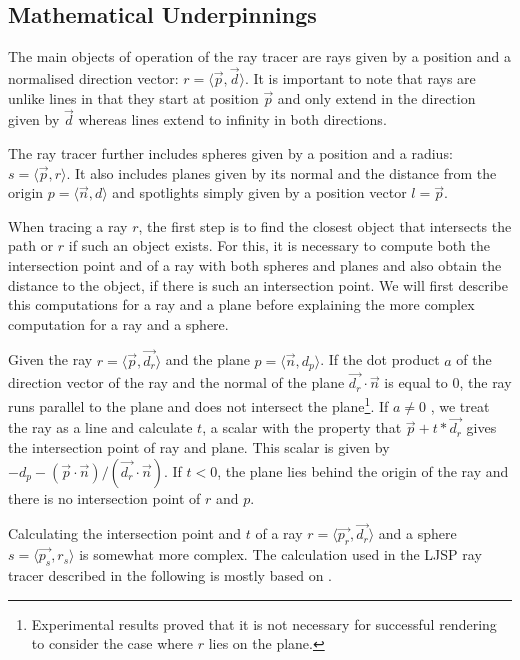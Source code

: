 \documentclass[11pt]{report}
\begin{document}
\subsection{Mathematical Underpinnings}
The main objects of operation of the ray tracer are rays given by a position and a normalised direction vector: $r = \langle \vec{p}, \vec{d} \rangle$. It is important to note that rays are unlike lines in that they start at position $\vec{p}$ and only extend in the direction given by $\vec{d}$ whereas lines extend to infinity in both directions.

The ray tracer further includes spheres given by a position and a radius: $s = \langle \vec{p}, r \rangle$. It also includes planes given by its normal and the distance from the origin $p = \langle \vec{n}, d \rangle$ and spotlights simply given by a position vector $l = \vec{p}$.

When tracing a ray $r$, the first step is to find the closest object that intersects the path or $r$ if such an object exists. For this, it is necessary to compute both the intersection point and of a ray with both spheres and planes and also obtain the distance to the object, if there is such an intersection point. We will first describe this computations for a ray and a plane before explaining the more complex computation for a ray and a sphere.

Given the ray $r = \langle \vec{p}, \vec{d_r} \rangle$ and the plane $p = \langle \vec{n}, d_p \rangle$. If the dot product $a$ of the direction vector of the ray and the normal of the plane $\vec{d_r} \cdot \vec{n}$ is equal to $0$, the ray runs parallel to the plane and does not intersect the plane\footnote{Experimental results proved that it is not necessary for successful rendering to consider the case where $r$ lies on the plane.}. If $a \neq 0$ , we treat the ray as a line and calculate $t$, a scalar with the property that $\vec{p} + t*\vec{d_r}$ gives the intersection point of ray and plane. This scalar is given by $-d_p-(\vec{p} \cdot \vec{n}) / (\vec{d_r} \cdot \vec{n})$. If $t < 0$, the plane lies behind the origin of the ray and there is no intersection point of $r$ and $p$.

Calculating the intersection point and $t$ of a ray $r = \langle \vec{p_r}, \vec{d_r} \rangle$ and a sphere $s = \langle \vec{p_s}, r_s \rangle$ is somewhat more complex. The calculation used in the LJSP ray tracer described in the following is mostly based on \cite{physrendering}.
\end{document}

